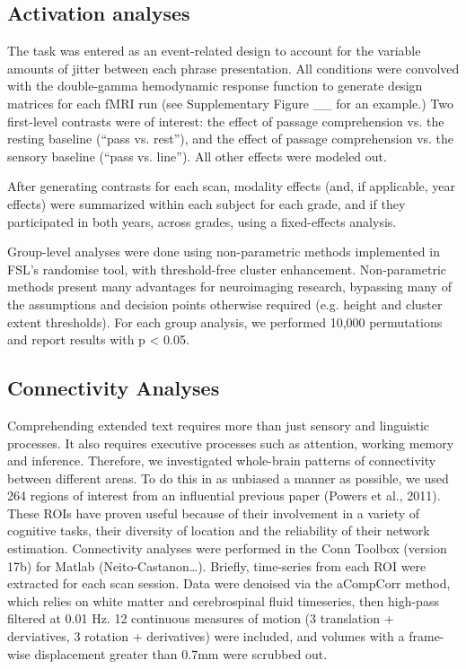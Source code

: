 \subsection{Activation analyses}

The task was entered as an event-related design to account for the variable amounts of jitter between each phrase presentation. All conditions were convolved with the double-gamma hemodynamic response function to generate design matrices for each fMRI run (see Supplementary Figure __ for an example.) Two first-level contrasts were of interest: the effect of passage comprehension vs. the resting baseline (“pass vs. rest”), and the effect of passage comprehension vs. the sensory baseline (“pass vs. line”). All other effects were modeled out.

After generating contrasts for each scan, modality effects (and, if applicable, year effects) were summarized within each subject for each grade, and if they participated in both years, across grades, using a fixed-effects analysis. 

Group-level analyses were done using non-parametric methods implemented in FSL’s randomise tool, with threshold-free cluster enhancement. Non-parametric methods present many advantages for neuroimaging research, bypassing many of the assumptions and decision points otherwise required (e.g. height and cluster extent thresholds). For each group analysis, we performed 10,000 permutations and report results with p < 0.05. 

\subsection{Connectivity Analyses}

Comprehending extended text requires more than just sensory and linguistic processes. It also requires executive processes such as attention, working memory and inference. Therefore, we investigated whole-brain patterns of connectivity between different areas. To do this in as unbiased a manner as possible, we used 264 regions of interest from an influential previous paper (Powers et al., 2011). These ROIs have proven useful because of their involvement in a variety of cognitive tasks, their diversity of location and the reliability of their network estimation. 
Connectivity analyses were performed in the Conn Toolbox (version 17b) for Matlab (Neito-Castanon…). Briefly, time-series from each ROI were extracted for each scan session. Data were denoised via the aCompCorr method, which relies on white matter and cerebrospinal fluid timeseries, then high-pass filtered at 0.01 Hz. 12 continuous measures of motion (3 translation + derviatives, 3 rotation + derivatives) were included, and volumes with a frame-wise displacement greater than 0.7mm were scrubbed out. 

